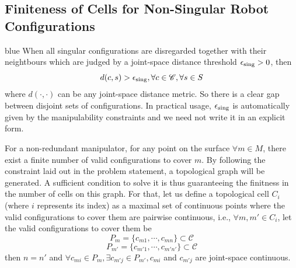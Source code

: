\documentclass[Afour,sageh,times]{sagej}
\begin{document}
\subsection{Finiteness of Cells for Non-Singular Robot Configurations}\label{subsection_regular_finiteness}
\begin{color}{blue}
When all singular configurations are disregarded together with their neightbours which are judged by a joint-space distance threshold $\epsilon_{\rm sing} > 0$, then 
\begin{equation}\label{equ_threshold}
d(c, s) > \epsilon_{\rm sing}, \forall c\in \mathscr{C}, \forall s\in S
\end{equation}
where $d(\cdot, \cdot)$ can be any joint-space distance metric. So there is a clear gap between disjoint sets of configurations. In practical usage, $\epsilon_{\rm sing}$ is automatically given by the manipulability constraints and we need not write it in an explicit form. 
\end{color}

For a non-redundant manipulator, for any point on the surface $\forall m\in M$, there exist a finite number of valid configurations to cover $m$. 
By following the constraint laid out in the problem statement, a topological graph will be generated. 
A sufficient condition to solve it is thus guaranteeing the finitness in the number of cells on this graph. For that, let us define a topological 
cell $C_i$ (where $i$ represents its index) as a maximal set of continuous points where the valid configurations to cover them are 
pairwise continuous, i.e., $\forall m, m'\in C_i$, let the valid configurations to cover them be 
\begin{equation}\label{equ_pm}
P_{m} = \{c_{m1}, \cdots, c_{mn}\}\subset \mathscr{C}
\end{equation}
\begin{equation}\label{equ_pm'}
P_{m'} = \{c_{m'1}, \cdots, c_{m'n'}\}\subset \mathscr{C}
\end{equation}
then $n = n'$ and
$\forall c_{mi}\in P_m, \exists c_{m'j} \in P_{m'}, c_{mi}$ and $ c_{m'j}$ are joint-space continuous.
\end{document}
